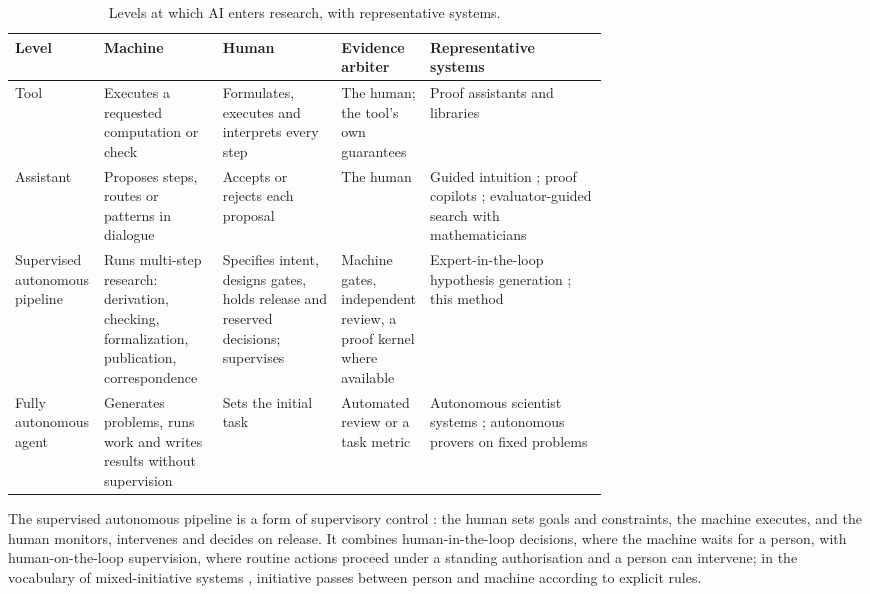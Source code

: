 \documentclass[11pt]{article}
\begin{document}
\begin{table}[htbp]
\centering\scriptsize
\caption{Levels at which AI enters research, with representative systems.}
\label{tab:levels}
\begin{tabularx}{\linewidth}{@{}>{\raggedright\arraybackslash}p{0.15\linewidth}>{\raggedright\arraybackslash}p{0.2\linewidth}>{\raggedright\arraybackslash}p{0.2\linewidth}>{\raggedright\arraybackslash}p{0.14\linewidth}>{\raggedright\arraybackslash}X@{}}
\toprule
Level & Machine & Human & Evidence arbiter & Representative systems \\
\midrule
Tool & Executes a requested computation or check & Formulates, executes and interprets every step & The human; the tool's own guarantees & Proof assistants and libraries \citep{lean4,mathlib} \\
Assistant & Proposes steps, routes or patterns in dialogue & Accepts or rejects each proposal & The human & Guided intuition \citep{davies}; proof copilots \citep{leandojo,leancopilot,dsp}; evaluator-guided search with mathematicians \citep{funsearch,georgiev} \\
Supervised autonomous pipeline & Runs multi-step research: derivation, checking, formalization, publication, correspondence & Specifies intent, designs gates, holds release and reserved decisions; supervises & Machine gates, independent review, a proof kernel where available & Expert-in-the-loop hypothesis generation \citep{coscientist}; this method \\
Fully autonomous agent & Generates problems, runs work and writes results without supervision & Sets the initial task & Automated review or a task metric & Autonomous scientist systems \citep{aiscientist,scientisttwo,kosmos}; autonomous provers on fixed problems \citep{alphaproof,aristotle} \\
\bottomrule
\end{tabularx}
\end{table}

The supervised autonomous pipeline is a form of supervisory control
\citep{sheridan}: the human sets goals and constraints, the machine executes,
and the human monitors, intervenes and decides on release. It combines
human-in-the-loop decisions, where the machine waits for a person, with
human-on-the-loop supervision, where routine actions proceed under a standing
authorisation and a person can intervene; in the vocabulary of
mixed-initiative systems \citep{horvitz}, initiative passes between person
and machine according to explicit rules.
\end{document}
